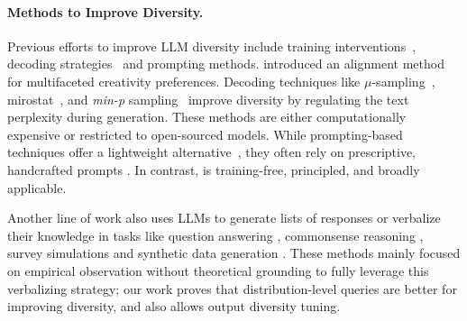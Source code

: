 \paragraph{Methods to Improve Diversity.} Previous efforts to improve LLM diversity include training interventions~\citep{chung2025modifyinglargelanguagemodel, zhou2025bridgingcreativityunderstandinggap}, decoding strategies~\citep{holtzman2020curiouscaseneuraltext,lanchantin2025diversepreferenceoptimization} and prompting methods. \cite{ismayilzada_creative_2025} introduced an alignment method for multifaceted creativity preferences. Decoding techniques like $\mu$-sampling~\citep{hewitt2022truncationsamplinglanguagemodel},  mirostat~\citep{basu2021mirostatneuraltextdecoding}, and \textit{min-p} sampling~\citep{nguyen_turning_2025} improve diversity by regulating the text perplexity during generation. 
These methods are either computationally expensive or restricted to open-sourced models. While prompting-based techniques offer a lightweight alternative~\citep{mehrotra2024enhancingcreativitylargelanguage, tian2025macgyverlargelanguagemodels}, they often rely on prescriptive, handcrafted prompts \citep{zhang2024improvingdiversitycommonsensegeneration, shurofry2024growingtailincreasingoutput, ge2025scalingsyntheticdatacreation, lu2025benchmarkinglanguagemodelcreativity, wong2024simplestratdiversifyinglanguagemodel}. 
In contrast, \ourslower is training-free, principled, and broadly applicable.


Another line of work also uses LLMs to generate lists of responses or verbalize their knowledge in tasks like question answering \citep{tian_just_2023, xiong_can_2024}, commonsense reasoning \citep{zhang2024improving}, survey simulations \citep{meister_benchmarking_2024} and synthetic data generation \citep{wang2023self, si2024can}. These methods mainly focused on empirical observation without theoretical grounding to fully leverage this verbalizing strategy; %
our work proves that distribution-level queries are better for improving diversity, and also allows output diversity tuning. %

